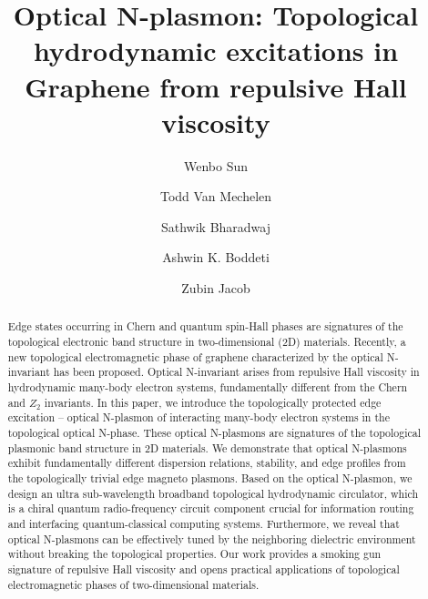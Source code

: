 \documentclass[%
reprint,
amsmath,amssymb,
aps,superscriptaddress
]{revtex4-2}
\begin{document}
	

\title{Optical N-plasmon: Topological hydrodynamic excitations in Graphene from repulsive Hall viscosity}

\author{Wenbo Sun}
\author{Todd Van Mechelen}
 \author{Sathwik Bharadwaj}
 \author{Ashwin K. Boddeti}
 \author{Zubin Jacob}

\begin{abstract}
Edge states occurring in Chern and quantum spin-Hall phases are signatures of the topological electronic band structure in two-dimensional (2D) materials. Recently, a new topological electromagnetic phase of graphene characterized by the optical N-invariant has been proposed. Optical N-invariant arises from repulsive Hall viscosity in hydrodynamic many-body electron systems, fundamentally different from the Chern and $Z_2$ invariants. In this paper, we introduce the topologically protected edge excitation -- optical N-plasmon of interacting many-body electron systems in the topological optical N-phase. These optical N-plasmons are signatures of the topological plasmonic band structure in 2D materials.  We demonstrate that optical N-plasmons exhibit fundamentally different dispersion relations, stability, and edge profiles from the topologically trivial edge magneto plasmons. Based on the optical N-plasmon, we design an ultra sub-wavelength broadband topological hydrodynamic circulator, which is a chiral quantum radio-frequency circuit component crucial for information routing and interfacing quantum-classical computing systems. Furthermore, we reveal that optical N-plasmons can be effectively tuned by the neighboring dielectric environment without breaking the topological properties. Our work provides a smoking gun signature of repulsive Hall viscosity and opens practical applications of topological electromagnetic phases of two-dimensional materials.
\end{abstract}
\end{document}
